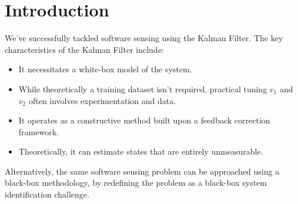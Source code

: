 \section{Introduction}

We've successfully tackled software sensing using the Kalman Filter.
The key characteristics of the Kalman Filter include:
\begin{itemize}
    \item It necessitates a white-box model of the system.
    \item While theoretically a training dataset isn't required, practical tuning $v_1$ and $v_2$ often involves experimentation and data.
    \item It operates as a constructive method built upon a feedback correction framework.
    \item Theoretically, it can estimate states that are entirely unmeasurable.
\end{itemize}
Alternatively, the same software sensing problem can be approached using a black-box methodology, by redefining the problem as a black-box system identification challenge.